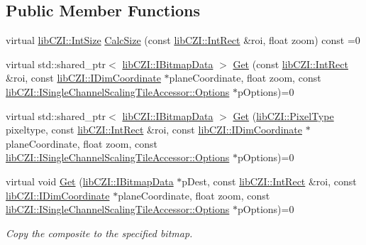 \subsection*{Public Member Functions}
\begin{DoxyCompactItemize}
\item 
virtual \hyperlink{structlib_c_z_i_1_1_int_size}{lib\+C\+Z\+I\+::\+Int\+Size} \hyperlink{classlib_c_z_i_1_1_i_single_channel_scaling_tile_accessor_aa7a0c9edcdd3460471edfdbe54fc2f76}{Calc\+Size} (const \hyperlink{structlib_c_z_i_1_1_int_rect}{lib\+C\+Z\+I\+::\+Int\+Rect} \&roi, float zoom) const =0
\item 
virtual std\+::shared\+\_\+ptr$<$ \hyperlink{classlib_c_z_i_1_1_i_bitmap_data}{lib\+C\+Z\+I\+::\+I\+Bitmap\+Data} $>$ \hyperlink{classlib_c_z_i_1_1_i_single_channel_scaling_tile_accessor_a3cd342d241a2c438a0b71d1342428a58}{Get} (const \hyperlink{structlib_c_z_i_1_1_int_rect}{lib\+C\+Z\+I\+::\+Int\+Rect} \&roi, const \hyperlink{classlib_c_z_i_1_1_i_dim_coordinate}{lib\+C\+Z\+I\+::\+I\+Dim\+Coordinate} $\ast$plane\+Coordinate, float zoom, const \hyperlink{structlib_c_z_i_1_1_i_single_channel_scaling_tile_accessor_1_1_options}{lib\+C\+Z\+I\+::\+I\+Single\+Channel\+Scaling\+Tile\+Accessor\+::\+Options} $\ast$p\+Options)=0
\item 
virtual std\+::shared\+\_\+ptr$<$ \hyperlink{classlib_c_z_i_1_1_i_bitmap_data}{lib\+C\+Z\+I\+::\+I\+Bitmap\+Data} $>$ \hyperlink{classlib_c_z_i_1_1_i_single_channel_scaling_tile_accessor_a1cd1fe10e445d286f4c64b75d4734caf}{Get} (\hyperlink{namespacelib_c_z_i_abf8ce12ab88b06c8b3b47efbb5e2e834}{lib\+C\+Z\+I\+::\+Pixel\+Type} pixeltype, const \hyperlink{structlib_c_z_i_1_1_int_rect}{lib\+C\+Z\+I\+::\+Int\+Rect} \&roi, const \hyperlink{classlib_c_z_i_1_1_i_dim_coordinate}{lib\+C\+Z\+I\+::\+I\+Dim\+Coordinate} $\ast$plane\+Coordinate, float zoom, const \hyperlink{structlib_c_z_i_1_1_i_single_channel_scaling_tile_accessor_1_1_options}{lib\+C\+Z\+I\+::\+I\+Single\+Channel\+Scaling\+Tile\+Accessor\+::\+Options} $\ast$p\+Options)=0
\item 
virtual void \hyperlink{classlib_c_z_i_1_1_i_single_channel_scaling_tile_accessor_a09a7963766e4c99721e6c3e13dca61cb}{Get} (\hyperlink{classlib_c_z_i_1_1_i_bitmap_data}{lib\+C\+Z\+I\+::\+I\+Bitmap\+Data} $\ast$p\+Dest, const \hyperlink{structlib_c_z_i_1_1_int_rect}{lib\+C\+Z\+I\+::\+Int\+Rect} \&roi, const \hyperlink{classlib_c_z_i_1_1_i_dim_coordinate}{lib\+C\+Z\+I\+::\+I\+Dim\+Coordinate} $\ast$plane\+Coordinate, float zoom, const \hyperlink{structlib_c_z_i_1_1_i_single_channel_scaling_tile_accessor_1_1_options}{lib\+C\+Z\+I\+::\+I\+Single\+Channel\+Scaling\+Tile\+Accessor\+::\+Options} $\ast$p\+Options)=0
\begin{DoxyCompactList}\small\item\em Copy the composite to the specified bitmap. \end{DoxyCompactList}\end{DoxyCompactItemize}


